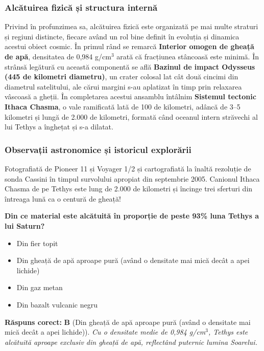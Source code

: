 \subsubsection*{Alcătuirea fizică și structura internă}
Privind în profunzimea sa, alcătuirea fizică este organizată pe mai multe straturi și regiuni distincte, fiecare având un rol bine definit în evoluția și dinamica acestui obiect cosmic. În primul rând se remarcă \textbf{Interior omogen de gheață de apă}, densitatea de 0,984 g/cm$^3$ arată că fracțiunea stâncoasă este minimă. În strânsă legătură cu această componentă se află \textbf{Bazinul de impact Odysseus (445 de kilometri diametru)}, un crater colosal lat cât două cincimi din diametrul satelitului, ale cărui margini s-au aplatizat în timp prin relaxarea vâscoasă a gheții. În completarea acestui ansamblu întâlnim \textbf{Sistemul tectonic Ithaca Chasma}, o vale ramificată lată de 100 de kilometri, adâncă de 3--5 kilometri și lungă de 2.000 de kilometri, formată când oceanul intern străvechi al lui Tethys a înghețat și s-a dilatat.

\subsubsection*{Observații astronomice și istoricul explorării}
Fotografiată de Pioneer 11 și Voyager 1/2 și cartografiată la înaltă rezoluție de sonda Cassini în timpul survolului apropiat din septembrie 2005. Canionul Ithaca Chasma de pe Tethys este lung de 2.000 de kilometri și încinge trei sferturi din întreaga lună ca o centură de gheață!

\vspace{6pt}
\begin{tcolorbox}[orbitarquiz, title={\textbf{Întrebare de verificare \#17: Tethys}}]
\textbf{Din ce material este alcătuită în proporție de peste 93\% luna Tethys a lui Saturn?}
\begin{itemize}[leftmargin=2.2em, itemsep=2pt, topsep=4pt]
  \item[$\square$ \textbf{A.}] Din fier topit
  \item[$\square$ \textbf{B.}] Din gheață de apă aproape pură (având o densitate mai mică decât a apei lichide)
  \item[$\square$ \textbf{C.}] Din gaz metan
  \item[$\square$ \textbf{D.}] Din bazalt vulcanic negru
\end{itemize}
\vspace{2pt}
{\footnotesize\color{orbitarMuted}\textbf{Răspuns corect:} \textbf{B} (Din gheață de apă aproape pură (având o densitate mai mică decât a apei lichide)). \emph{Cu o densitate medie de 0,984 g/cm$^3$, Tethys este alcătuită aproape exclusiv din gheață de apă, reflectând puternic lumina Soarelui.}}
\end{tcolorbox}
\clearpage


